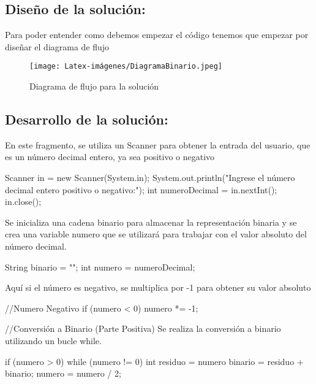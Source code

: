 \subsection{\textbf{Diseño de la solución:}}
Para poder entender como debemos empezar el código tenemos que empezar por diseñar el diagrama de flujo 

\begin{figure}[h!]
    \centering
    \texttt{[image: Latex-imágenes/DiagramaBinario.jpeg]}
    \caption{Diagrama de flujo para la solución}
    \label{fig: Calcular número Binario}
\end{figure}


\subsection{\textbf{Desarrollo de la solución:}}
En este fragmento, se utiliza un Scanner para obtener la entrada del usuario, que es un número decimal entero, ya sea positivo o negativo
\begin{javaCode}

Scanner in = new Scanner(System.in);
System.out.println("Ingrese el número decimal entero positivo o negativo:");
int numeroDecimal = in.nextInt();
in.close();
        
\end{javaCode}

Se inicializa una cadena binario para almacenar la representación binaria y se crea una variable numero que se utilizará para trabajar con el valor absoluto del número decimal.

\begin{javaCode}
    String binario = "";
int numero = numeroDecimal;
\end{javaCode}

Aquí si el número es negativo, se multiplica por -1 para obtener su valor absoluto

\begin{javaCode}
    //Numero Negativo
    if (numero < 0) {
    numero *= -1;
}
\end{javaCode}
//Conversión a Binario (Parte Positiva)
Se realiza la conversión a binario utilizando un bucle while.\\
\begin{javaCode}
    if (numero > 0) {
    while (numero != 0) {
        int residuo = numero %
        binario = residuo + binario;
        numero = numero / 2;
    }
}   
\end{javaCode}

